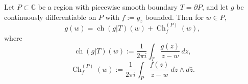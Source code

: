 Let $P \subset \mathbb{C}$ be a region with piecewise smooth boundary $T = \partial P$, and let $g$ be continuously differentiable on $P$ with $f := g_{\bar{z}}$ bounded. Then for $w \in P$,
$$g(w) = \operatorname{ch}(g|T)(w) + \operatorname{Ch}_f^{(P)}(w),$$
where
$$\operatorname{ch}(g|T)(w) := \frac{1}{2\pi i} \int_T \frac{g(z)}{z-w}\,dz,$$
$$\operatorname{Ch}_f^{(P)}(w) := \frac{1}{2\pi i} \int_P \frac{f(z)}{z-w}\,dz \wedge d\bar{z}.$$
